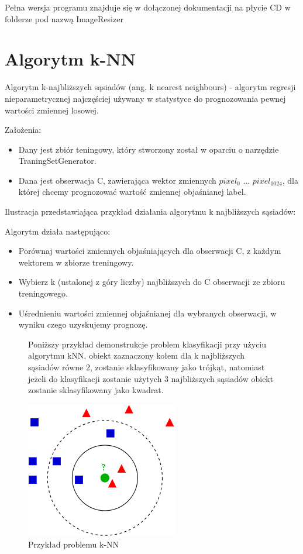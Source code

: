 \documentclass[brudnopis]{xmgr}
\begin{document}
Pełna wersja programu znajduje się w dołączonej dokumentacji na płycie CD w folderze pod nazwą ImageResizer
\newpage

\section{Algorytm k-NN}

Algorytm k-najbliższych sąsiadów (ang. k nearest neighbours) - algorytm regresji nieparametrycznej najczęściej używany w statystyce do prognozowania pewnej wartości zmiennej losowej.

Założenia:
\begin{itemize}
\item
Dany jest zbiór teningowy, który stworzony został w oparciu o narzędzie TraningSetGenerator.
\item
Dana jest obserwacja C, zawierająca wektor zmiennych $pixel_{0}$ ... $pixel_{1024}$, dla której chcemy prognozować wartość zmiennej objaśnianej label.
\end{itemize}	

   Ilustracja przedstawiająca przykład działania algorytmu k najbliższych sąsiadów:

Algorytm działa następująco:
\begin{itemize}
\item
Porównaj wartości zmiennych objaśniających dla obserwacji C, z każdym wektorem w zbiorze treningowy.
\item
Wybierz k (ustalonej z góry liczby) najbliższych do C obserwacji ze zbioru treningowego.
\item
Uśrednieniu wartości zmiennej objaśnianej dla wybranych obserwacji, w wyniku czego uzyskujemy prognozę.	
\end{itemize}	
     
\begin{figure}[!tbh]

Poniższy przykład demonstrukcje problem klasyfikacji przy użyciu algorytmu kNN, obiekt zaznaczony kołem dla k najbliższych sąsiadów równe 2, zostanie sklasyfikowany jako trójkąt, natomiast jeżeli do klasyfikacji zostanie użytych 3 najbliższych sąsiadów obiekt zostanie sklasyfikowany jako kwadrat.

\centering
\includegraphics[width=.6\hsize]{fig/knn}
\caption{Przykład problemu k-NN}
\end{figure}
\newpage
\end{document}
